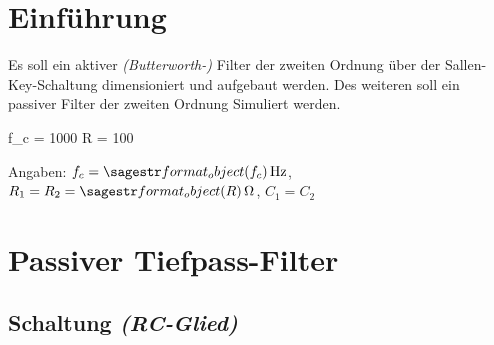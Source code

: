 \documentclass[a4paper]{hitec}
\author{Rene Hampölz, Gruppe 6}
\date{19. September 2022}
\begin{document}
\maketitletoc
\clearpage

\section{Einführung}

Es soll ein aktiver \textit{(Butterworth-)} Filter der zweiten Ordnung über der Sallen-Key-Schaltung dimensioniert und aufgebaut werden. Des weiteren soll ein passiver Filter der zweiten Ordnung Simuliert werden.

\begin{sagesilent}
    f_c = 1000
    R = 100
\end{sagesilent}

Angaben: $f_c = \SIvar{f_c}{\hertz}$, $R_1 = R_2 = \SIvar{R}{\ohm}$, $C_1 = C_2$

\section{Passiver Tiefpass-Filter}

\subsection{Schaltung \textit{(RC-Glied)}}
\end{document}
